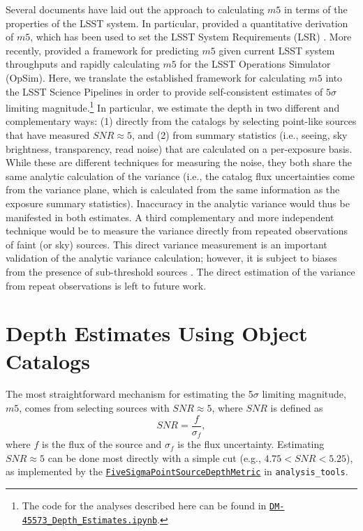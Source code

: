 \documentclass[DM,authoryear,toc]{lsstdoc}
\begin{document}
Several documents have laid out the approach to calculating $m5$ in terms of the properties of the LSST system. In particular, \citet{LSE-40} provided a quantitative derivation of $m5$, which has been used to set the LSST System Requirements (LSR) \citep{LSE-29}. More recently, \citet{SMTN-002} provided a framework for predicting $m5$ given current LSST system throughputs and rapidly calculating $m5$ for the LSST Operations Simulator (OpSim). Here, we translate the established framework for calculating $m5$ into the LSST Science Pipelines in order to provide self-consistent estimates of $5\sigma$ limiting magnitude.\footnote{The code for the analyses described here can be found in \href{https://github.com/lsst-dm/vv-team-notebooks/tree/main/notebooks}{\texttt{DM-45573\_Depth\_Estimates.ipynb}}.} In particular, we estimate the depth in two different and complementary ways: (1) directly from the catalogs by selecting point-like sources that have measured ${SNR} \approx 5$, and (2) from summary statistics (i.e., seeing, sky brightness, transparency, read noise) that are calculated on a per-exposure basis. While these are different techniques for measuring the noise, they both share the same analytic calculation of the variance (i.e., the catalog flux uncertainties come from the variance plane, which is calculated from the same information as the exposure summary statistics). Inaccuracy in the analytic variance would thus be manifested in both estimates. A third complementary and more independent technique would be to measure the variance directly from repeated observations of faint (or sky) sources. This direct variance measurement is an important validation of the analytic variance calculation; however, it is subject to biases from the presence of sub-threshold sources \citep[e.g.,][]{Eckert:2020}. The direct estimation of the variance from repeat observations is left to future work.

\section{Depth Estimates Using Object Catalogs}

The most straightforward mechanism for estimating the 5$\sigma$ limiting magnitude, $m5$, comes from selecting sources with ${SNR} \approx 5$, where $SNR$ is defined as
\begin{equation}
\label{eqn:flux_snr}
SNR = \frac{f}{\sigma_f},
\end{equation}
where $f$ is the flux of the source and $\sigma_f$ is the flux uncertainty.
Estimating $SNR \approx 5$ can be done most directly with a simple cut (e.g., $4.75 < SNR < 5.25$), as implemented by the \href{https://github.com/lsst/analysis_tools/blob/1eab82deb581fff22c4bd353dabf200f98e2518d/python/lsst/analysis/tools/atools/limitingMagnitudeMetric.py}{\texttt{FiveSigmaPointSourceDepthMetric}} in \texttt{analysis\_tools}.
\end{document}
